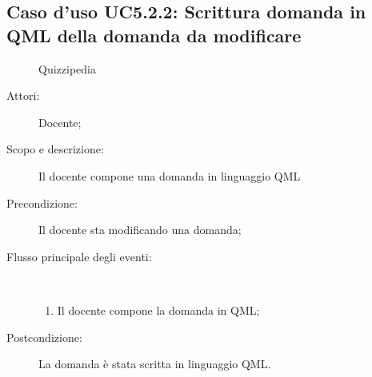 \subsection{Caso d'uso UC5.2.2: Scrittura domanda in QML della domanda da modificare}
	\begin{figure}[H]
		\centering
		\begin{resizedtikzpicture}{\textwidth}
		\begin{umlsystem}[x=0, fill=lightgray!20]{Quizzipedia}
		\end{umlsystem}
		\end{resizedtikzpicture}
		\caption{}
	\end{figure}
\begin{description}
\item[Attori:] Docente;
\item[Scopo e descrizione:] Il docente compone una domanda in linguaggio QML
      \item[Precondizione:] Il docente sta modificando una domanda;

        \item[Flusso principale degli eventi:] \ 
 \begin{enumerate}
          \item Il docente compone la domanda in QML;

      \end{enumerate}
    \item[Postcondizione:] La domanda è stata scritta in linguaggio QML.
  \end{description}
\hypertarget{UC5.2.3}{}
